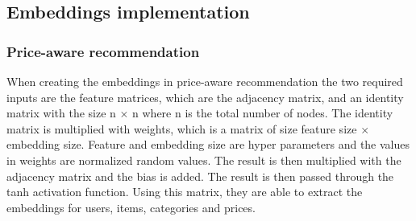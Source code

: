 \subsection{Embeddings implementation}
\subsubsection{Price-aware recommendation}
When creating the embeddings in price-aware recommendation the two required inputs are the feature matrices, which are the adjacency matrix, and an identity matrix with the size n $\times$ n where n is the total number of nodes.
The identity matrix is multiplied with weights, which is a matrix of size feature size $\times$ embedding size.
Feature and embedding size are hyper parameters and the values in weights are normalized random values.
The result is then multiplied with the adjacency matrix and the bias is added.
The result is then passed through the tanh activation function.
Using this matrix, they are able to extract the embeddings for users, items, categories and prices.